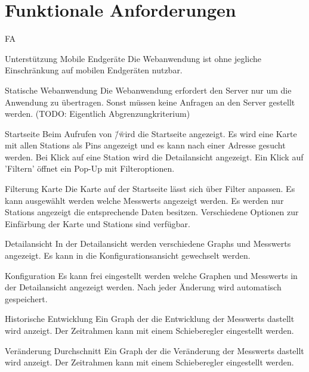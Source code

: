 \section{Funktionale Anforderungen}

\setcounter{counter}{10}
\begin{Kriterien}{FA}

 \item[Unterstützung Mobile Endgeräte]
   Die Webanwendung ist ohne jegliche Einschränkung auf mobilen Endgeräten nutzbar.  

 \item[Statische Webanwendung]
   Die Webanwendung erfordert den Server nur um die Anwendung zu übertragen.
   Sonst müssen keine Anfragen an den Server gestellt werden. (TODO: Eigentlich Abgrenzungkriterium)

 \item[Startseite]
   Beim Aufrufen von \"/\" wird die Startseite angezeigt.
   Es wird eine Karte mit allen \glspl{Station} als \glspl{Pin} angezeigt und es kann nach einer Adresse gesucht werden.
   Bei Klick auf eine Station wird die Detailansicht angezeigt.
   Ein Klick auf 'Filtern' öffnet ein \gls{Pop-Up} mit Filteroptionen.

 \item[Filterung Karte]
   Die Karte auf der Startseite lässt sich über Filter anpassen.
   Es kann ausgewählt werden welche \glspl{Messwert} angezeigt werden.
   Es werden nur \glspl{Station} angezeigt die entsprechende Daten besitzen.
   Verschiedene Optionen zur Einfärbung der Karte und \glspl{Station} sind verfügbar.

 \item[Detailansicht]
   In der Detailansicht werden verschiedene \glspl{Graph} und \glspl{Messwert} angezeigt.
   Es kann in die Konfigurationsansicht gewechselt werden.

 \item[Konfiguration]
   Es kann frei eingestellt werden welche Graphen und \glspl{Messwert} in der Detailansicht angezeigt werden.
   Nach jeder Änderung wird automatisch gespeichert. 

 \item[Historische Entwicklung]
   Ein Graph der die Entwicklung der \glspl{Messwert} dastellt wird anzeigt.
   Der Zeitrahmen kann mit einem Schieberegler eingestellt werden.
 
 \item[Veränderung Durchschnitt]
   Ein Graph der die Veränderung der \glspl{Messwert} dastellt wird anzeigt.
   Der Zeitrahmen kann mit einem Schieberegler eingestellt werden.


\end{Kriterien}
